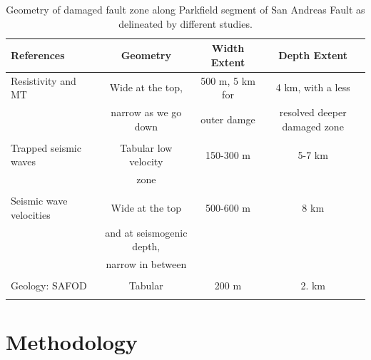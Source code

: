 \documentclass[11pt]{article}
\begin{document}
\begin{table}[!htb]
    \footnotesize
    \begin{tabular}{l c c c}
        \toprule
        References & Geometry & Width Extent & Depth Extent \\
        \midrule

        Resistivity and MT  & Wide at the top, & 500 m, 5 km for & 4 km, with a less \\
        \citep{unsworth_1997} & narrow as we go down & outer damge & resolved deeper damaged zone \\
        \\
        
        Trapped seismic waves & Tabular low velocity & 150-300 m & 5-7 km \\
        \citep{lewis_2010} & zone & & \\
        \\
        
        Seismic wave velocities & Wide at the top & 500-600 m & 8 km \\
        \citep{thurber_2003} & and at seismogenic depth, & & \\
                             & narrow in between & & \\
        \\

        Geology: SAFOD & Tabular & 200 m & 2. km \\
        \citep{lockner_2011} & & & \\

        \bottomrule

    \end{tabular}
    \caption{Geometry of damaged fault zone along Parkfield segment of San Andreas Fault as delineated by different studies.}
\end{table}


\section{Methodology}
\end{document}
